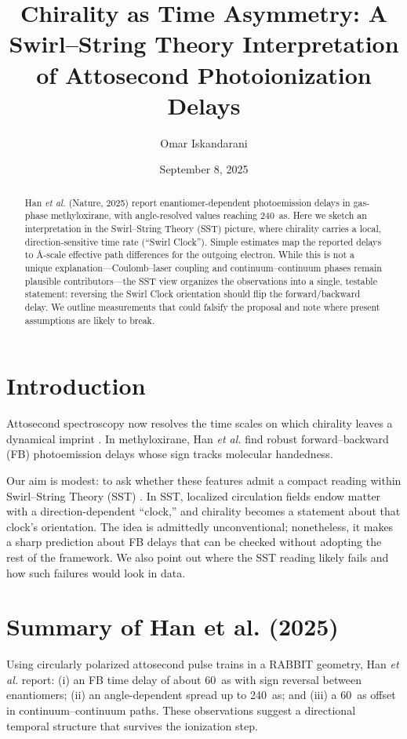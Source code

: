 \documentclass[reprint, aps, prl, longbibliography]{revtex4-2}
\begin{document}
\title{Chirality as Time Asymmetry: A Swirl--String Theory Interpretation of Attosecond Photoionization Delays}
\author{Omar Iskandarani}
\date{September 8, 2025}

\begin{abstract}
Han \emph{et al.} (Nature, 2025) report enantiomer-dependent photoemission delays in gas-phase methyloxirane, with angle-resolved values reaching \SI{240}{\atto\second}. Here we sketch an interpretation in the Swirl--String Theory (SST) picture, where chirality carries a local, direction-sensitive time rate (“Swirl Clock”). Simple estimates map the reported delays to Å-scale effective path differences for the outgoing electron. While this is not a unique explanation—Coulomb–laser coupling and continuum–continuum phases remain plausible contributors—the SST view organizes the observations into a single, testable statement: reversing the Swirl Clock orientation should flip the forward/backward delay. We outline measurements that could falsify the proposal and note where present assumptions are likely to break.
\end{abstract}


\maketitle


\section{Introduction}
Attosecond spectroscopy now resolves the time scales on which chirality leaves a dynamical imprint \cite{Krausz2009,Beaulieu2018}. In methyloxirane, Han \emph{et al.} \cite{Han2025} find robust forward–backward (FB) photoemission delays whose sign tracks molecular handedness.

Our aim is modest: to ask whether these features admit a compact reading within Swirl--String Theory (SST) \cite{IskandaraniSSTCanon}. In SST, localized circulation fields endow matter with a direction-dependent “clock,” and chirality becomes a statement about that clock’s orientation. The idea is admittedly unconventional; nonetheless, it makes a sharp prediction about FB delays that can be checked without adopting the rest of the framework. We also point out where the SST reading likely fails and how such failures would look in data.


\section{Summary of Han et al. (2025)}
Using circularly polarized attosecond pulse trains in a RABBIT geometry, Han \emph{et al.} \cite{Han2025} report:
(i) an FB time delay of about \SI{60}{\atto\second} with sign reversal between enantiomers;
(ii) an angle-dependent spread up to \SI{240}{\atto\second}; and
(iii) a \SI{60}{\atto\second} offset in continuum–continuum paths.
These observations suggest a directional temporal structure that survives the ionization step.
\end{document}
